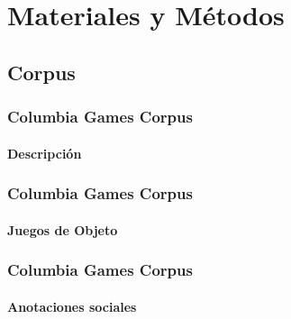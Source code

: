 \documentclass{beamer}
\begin{document}
\section{Materiales y Métodos}

\subsection{Corpus}
\begin{frame}
  \frametitle{Columbia Games Corpus}
  \framesubtitle{Descripción}

\end{frame}


\begin{frame}
  \frametitle{Columbia Games Corpus}
  \framesubtitle{Juegos de Objeto}

\end{frame}


\begin{frame}
  \frametitle{Columbia Games Corpus}
  \framesubtitle{Anotaciones sociales}

\end{frame}
\end{document}
